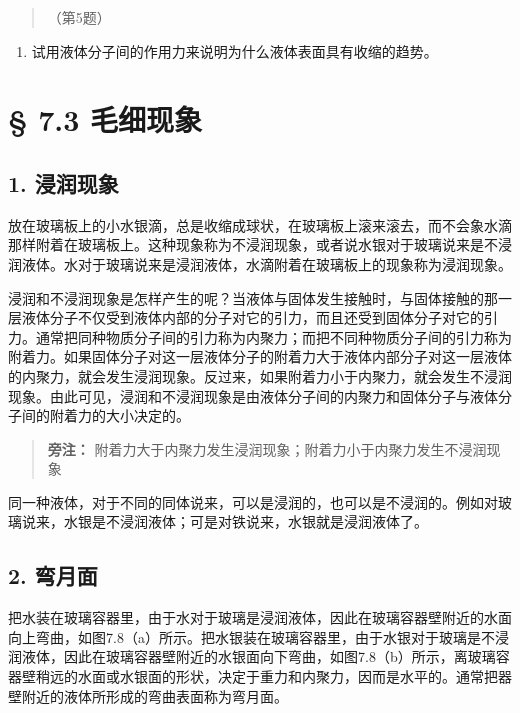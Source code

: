 \begin{quote}
（第5题）
\end{quote}

\begin{enumerate}
\def\labelenumi{\arabic{enumi}.}
\setcounter{enumi}{5}
\tightlist
\item
  试用液体分子间的作用力来说明为什么液体表面具有收缩的趋势。
\end{enumerate}

\section{§ 7.3 毛细现象}\label{ux6bdbux7ec6ux73b0ux8c61}

\subsection{1. 浸润现象}\label{ux6d78ux6da6ux73b0ux8c61}

放在玻璃板上的小水银滴，总是收缩成球状，在玻璃板上滚来滚去，而不会象水滴那样附着在玻璃板上。这种现象称为不浸润现象，或者说水银对于玻璃说来是不浸润液体。水对于玻璃说来是浸润液体，水滴附着在玻璃板上的现象称为浸润现象。

浸润和不浸润现象是怎样产生的呢？当液体与固体发生接触时，与固体接触的那一层液体分子不仅受到液体内部的分子对它的引力，而且还受到固体分子对它的引力。通常把同种物质分子间的引力称为内聚力；而把不同种物质分子间的引力称为附着力。如果固体分子对这一层液体分子的附着力大于液体内部分子对这一层液体的内聚力，就会发生浸润现象。反过来，如果附着力小于内聚力，就会发生不浸润现象。由此可见，浸润和不浸润现象是由液体分子间的内聚力和固体分子与液体分子间的附着力的大小决定的。

\begin{quote}
\textbf{旁注：}
附着力大于内聚力发生浸润现象；附着力小于内聚力发生不浸润现象
\end{quote}

同一种液体，对于不同的同体说来，可以是浸润的，也可以是不浸润的。例如对玻璃说来，水银是不浸润液体；可是对铁说来，水银就是浸润液体了。

\subsection{2. 弯月面}\label{ux5f2fux6708ux9762}

把水装在玻璃容器里，由于水对于玻璃是浸润液体，因此在玻璃容器壁附近的水面向上弯曲，如图7.8（a）所示。把水银装在玻璃容器里，由于水银对于玻璃是不浸润液体，因此在玻璃容器壁附近的水银面向下弯曲，如图7.8（b）所示，离玻璃容器壁稍远的水面或水银面的形状，决定于重力和内聚力，因而是水平的。通常把器壁附近的液体所形成的弯曲表面称为弯月面。

